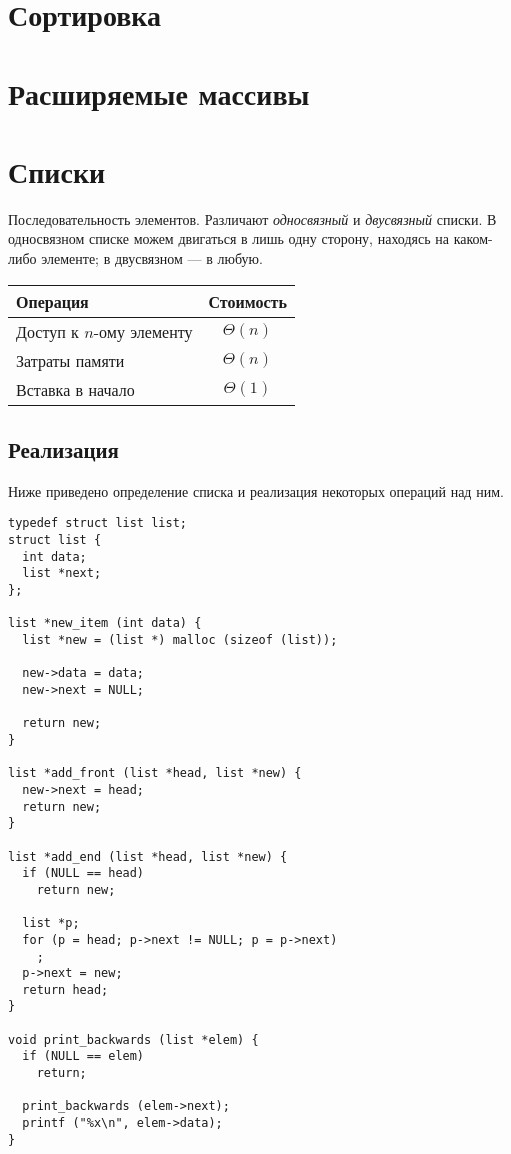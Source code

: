 \section{Сортировка}
\label{sec:sorting}

\section{Расширяемые массивы}
\label{sec:ext-arrays}

\section{Списки}
\label{sec:lists}

Последовательность элементов. Различают \emph{односвязный} и \emph{двусвязный} списки. В односвязном списке можем двигаться в лишь одну сторону, находясь на каком-либо элементе; в двусвязном --- в любую.
\begin{center}
  \begin{tabular}{lc}
    \toprule
    Операция & Стоимость \\
    \midrule
    Доступ к $n$-ому элементу & $\Theta(n)$ \\
    Затраты памяти & $\Theta(n)$ \\
    Вставка в начало & $\Theta(1)$ \\
    \bottomrule
  \end{tabular}
\end{center}

\subsection{Реализация}
Ниже приведено определение списка и реализация некоторых операций над ним.

\lstset{label=lst:list-impl,caption=Некоторые операции}
\begin{lstlisting}
typedef struct list list;
struct list {
  int data;
  list *next;
};

list *new_item (int data) {
  list *new = (list *) malloc (sizeof (list));

  new->data = data;
  new->next = NULL;

  return new;
}

list *add_front (list *head, list *new) {
  new->next = head;
  return new;
}

list *add_end (list *head, list *new) {
  if (NULL == head)
    return new;

  list *p;
  for (p = head; p->next != NULL; p = p->next)
    ;
  p->next = new;
  return head;
}

void print_backwards (list *elem) {
  if (NULL == elem)
    return;

  print_backwards (elem->next);
  printf ("%x\n", elem->data);
}
\end{lstlisting}

